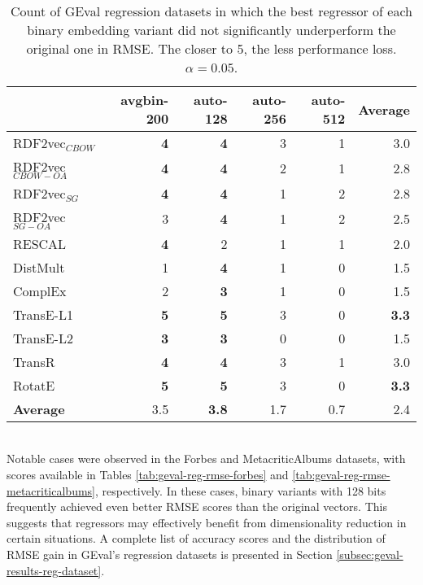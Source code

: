 \documentclass[11pt,titlepage,oneside,openany]{book}
\begin{document}
\begin{table}[h!]
\centering
\begin{tabular}{lrrrrr}
\toprule
{} &  avgbin-200 &  auto-128 &  auto-256 &  auto-512 &  \textbf{Average} \\
\midrule
RDF2vec$_{CBOW}$     &	\textbf{4} &	\textbf{4} &         3  &         1 & 3.0 \\
RDF2vec$_{CBOW-OA}$  &	\textbf{4} &	\textbf{4} &         2  &         1 & 2.8 \\
RDF2vec$_{SG}$       &	\textbf{4} &	\textbf{4} &         1  &         2 & 2.8 \\
RDF2vec$_{SG-OA}$    &           3  &	\textbf{4} &         1  &         2 & 2.5 \\
RESCAL               &	\textbf{4} &         2  &         1  &         1 & 2.0 \\
DistMult             &           1  &	\textbf{4} &         1  &         0 & 1.5  \\
ComplEx              &           2  &	\textbf{3} &         1  &         0 & 1.5 \\
TransE-L1            &	\textbf{5} &	\textbf{5} &         3  &         0 & \textbf{3.3} \\
TransE-L2            &	\textbf{3} &	\textbf{3} &         0  &         0 & 1.5 \\
TransR               &	\textbf{4} &	\textbf{4} &         3  &         1 & 3.0 \\
RotatE               &	\textbf{5} &	\textbf{5} &         3  &         0 & \textbf{3.3} \\
\midrule
\textbf{Average}     &        3.5  &      \textbf{3.8}  &      1.7  &	0.7 & 2.4 \\
\bottomrule
\end{tabular}
\caption{Count of GEval regression datasets in which the best regressor of each binary embedding variant did not significantly underperform the original one in RMSE. The closer to 5, the less performance loss. $\alpha=0.05$.}
\label{tab:geval-reg-rmse-significantly-not-worse}
\end{table}
\\
Notable cases were observed in the Forbes and MetacriticAlbums datasets, with scores available in Tables \ref{tab:geval-reg-rmse-forbes} and \ref{tab:geval-reg-rmse-metacriticalbums}, respectively. In these cases, binary variants with 128 bits frequently achieved even better RMSE scores than the original vectors. This suggests that regressors may effectively benefit from dimensionality reduction in certain situations. A complete list of accuracy scores and the distribution of RMSE gain in GEval's regression datasets is presented in Section \ref{subsec:geval-results-reg-dataset}.
\end{document}
